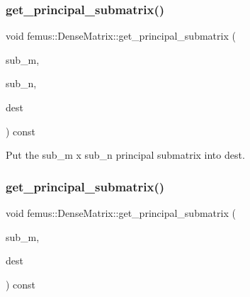 \mbox{\label{classfemus_1_1_dense_matrix_ac6fa82dae47d2bb783f8b1507b730b1b}} 
\subsubsection{\texorpdfstring{get\+\_\+principal\+\_\+submatrix()}{get\_principal\_submatrix()}\hspace{0.1cm}{\footnotesize\ttfamily [1/2]}}
{\footnotesize\ttfamily void femus\+::\+Dense\+Matrix\+::get\+\_\+principal\+\_\+submatrix (\begin{DoxyParamCaption}\item[{int}]{sub\+\_\+m,  }\item[{int}]{sub\+\_\+n,  }\item[{\mbox{\hyperlink{classfemus_1_1_dense_matrix}{Dense\+Matrix}} \&}]{dest }\end{DoxyParamCaption}) const}



Put the {\ttfamily sub\+\_\+m} x {\ttfamily sub\+\_\+n} principal submatrix into {\ttfamily dest}. 

\mbox{\label{classfemus_1_1_dense_matrix_ace38881dc4185f79340438082fcfccfd}} 
\subsubsection{\texorpdfstring{get\+\_\+principal\+\_\+submatrix()}{get\_principal\_submatrix()}\hspace{0.1cm}{\footnotesize\ttfamily [2/2]}}
{\footnotesize\ttfamily void femus\+::\+Dense\+Matrix\+::get\+\_\+principal\+\_\+submatrix (\begin{DoxyParamCaption}\item[{int}]{sub\+\_\+m,  }\item[{\mbox{\hyperlink{classfemus_1_1_dense_matrix}{Dense\+Matrix}} \&}]{dest }\end{DoxyParamCaption}) const}



